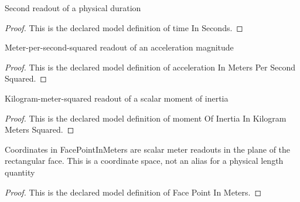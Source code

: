 \begin{definition}
  \label{def:physics:phyx-mini-0265:phyxminiproblems-problemphyxmini0265-timeinseconds}
  Second readout of a physical duration
\end{definition}
\begin{proof}
  This is the declared model definition of time In Seconds.
\end{proof}
\begin{definition}
  \label{def:physics:phyx-mini-0265:phyxminiproblems-problemphyxmini0265-accelerationinmeterspersecondsquared}
  Meter-per-second-squared readout of an acceleration magnitude
\end{definition}
\begin{proof}
  This is the declared model definition of acceleration In Meters Per Second Squared.
\end{proof}
\begin{definition}
  \label{def:physics:phyx-mini-0265:phyxminiproblems-problemphyxmini0265-momentofinertiainkilogrammeterssquared}
  Kilogram-meter-squared readout of a scalar moment of inertia
\end{definition}
\begin{proof}
  This is the declared model definition of moment Of Inertia In Kilogram Meters Squared.
\end{proof}
\begin{definition}
  \label{def:physics:phyx-mini-0265:phyxminiproblems-problemphyxmini0265-facepointinmeters}
  Coordinates in FacePointInMeters are scalar meter readouts in the plane of the rectangular face. This is a coordinate space, not an alias for a physical length quantity
\end{definition}
\begin{proof}
  This is the declared model definition of Face Point In Meters.
\end{proof}
